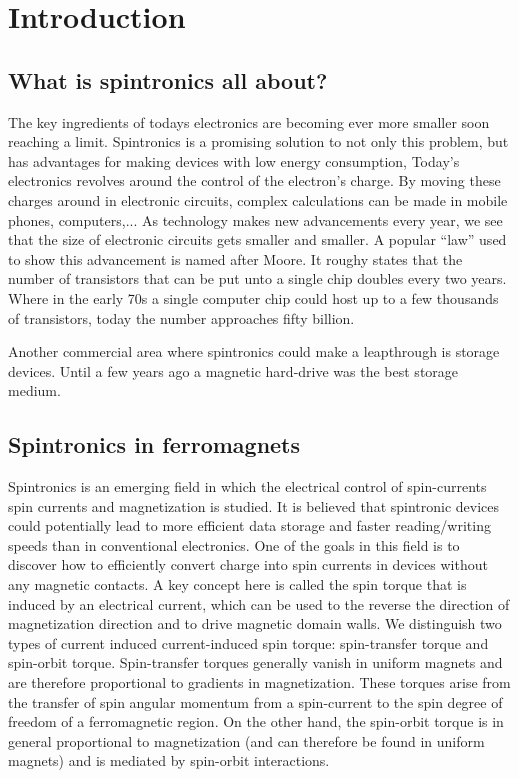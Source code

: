 \chapter{Introduction}\label{ch:introduction}
\section{What is spintronics all about?}
The key ingredients of todays electronics are becoming ever more smaller soon reaching a limit. Spintronics is a promising solution to not only this problem, but has advantages for making devices with low energy consumption, 
Today's electronics revolves around the control of the electron's charge. By moving these charges around in electronic circuits, complex calculations can be made in mobile phones, computers,... As technology makes new advancements every year, we see that the size of electronic circuits gets smaller and smaller. A popular ``law'' used to show this advancement is named after Moore. It roughy states that the number of transistors that can be put unto a single chip doubles every two years. Where in the early 70s a single computer chip could host up to a few thousands of transistors, today the number approaches fifty billion.  

Another commercial area where spintronics could make a leapthrough is storage devices. Until a few years ago a magnetic hard-drive was the best storage medium. 

\section{Spintronics in ferromagnets}
Spintronics is an emerging field in which the electrical control of spin-currents spin currents
and magnetization is studied. It is believed that spintronic devices could potentially lead to
more efficient data storage and faster reading/writing speeds than in conventional electronics. One
of the goals in this field is to discover how to efficiently convert charge into spin
currents in devices without any magnetic contacts. A key concept here is called the spin torque that is induced by an electrical current, which can be used to the reverse the direction of magnetization direction and
to drive magnetic domain walls. We distinguish two types of current induced current-induced spin
torque: spin-transfer torque and spin-orbit torque. Spin-transfer torques generally vanish in
uniform magnets and are therefore proportional to gradients in magnetization. These torques arise
from the transfer of spin angular momentum from a spin-current to the spin degree of
freedom of a ferromagnetic region. 
On the other hand, the spin-orbit torque is in general proportional to
magnetization (and can therefore be found in uniform magnets) and is mediated by spin-orbit interactions.

